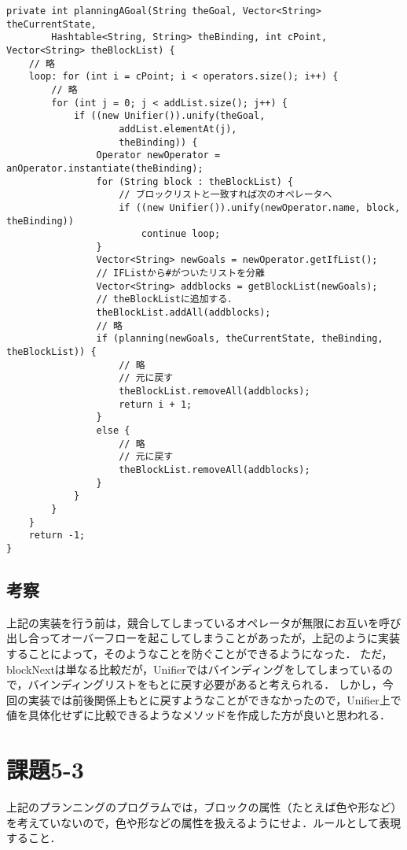 \documentclass{jarticle}
\begin{document}
\begin{lstlisting}[caption=変数まで同じオペレータが呼ばれないようにする,label=src:blockList]
private int planningAGoal(String theGoal, Vector<String> theCurrentState,
        Hashtable<String, String> theBinding, int cPoint, Vector<String> theBlockList) {
    // 略
    loop: for (int i = cPoint; i < operators.size(); i++) {
        // 略
        for (int j = 0; j < addList.size(); j++) {
            if ((new Unifier()).unify(theGoal,
                    addList.elementAt(j),
                    theBinding)) {
                Operator newOperator = anOperator.instantiate(theBinding);
                for (String block : theBlockList) {
                    // ブロックリストと一致すれば次のオペレータへ
                    if ((new Unifier()).unify(newOperator.name, block, theBinding))
                        continue loop;
                }
                Vector<String> newGoals = newOperator.getIfList();
                // IFListから#がついたリストを分離
                Vector<String> addblocks = getBlockList(newGoals);
                // theBlockListに追加する．
                theBlockList.addAll(addblocks);
                // 略
                if (planning(newGoals, theCurrentState, theBinding, theBlockList)) {
                    // 略
                    // 元に戻す
                    theBlockList.removeAll(addblocks);
                    return i + 1;
                }
                else {
                    // 略
                    // 元に戻す
                    theBlockList.removeAll(addblocks);
                }
            }
        }
    }
    return -1;
}
\end{lstlisting}

\subsection{考察}
上記の実装を行う前は，競合してしまっているオペレータが無限にお互いを呼び出し合ってオーバーフローを起こしてしまうことがあったが，上記のように実装することによって，そのようなことを防ぐことができるようになった．
ただ，blockNextは単なる比較だが，Unifierではバインディングをしてしまっているので，バインディングリストをもとに戻す必要があると考えられる．
しかし，今回の実装では前後関係上もとに戻すようなことができなかったので，Unifier上で値を具体化せずに比較できるようなメソッドを作成した方が良いと思われる．

\section{課題5-3}
\begin{screen}
上記のプランニングのプログラムでは，ブロックの属性（たとえば色や形など）を考えていないので，色や形などの属性を扱えるようにせよ．ルールとして表現すること．
\end{screen}
\end{document}
